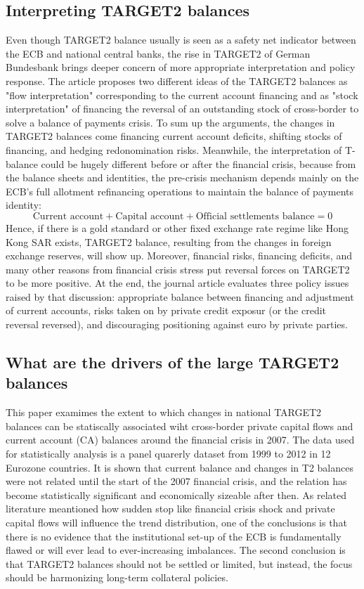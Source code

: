 \documentclass[12pt]{article}
\begin{document}
\subsection{Interpreting TARGET2 balances}
Even though TARGET2 balance usually is seen as a safety net indicator between the ECB and national central banks, the rise in TARGET2 of German Bundesbank brings deeper concern of more appropriate interpretation and policy response. The article proposes two different ideas of the TARGET2 balances as "flow interpretation" corresponding to the current account financing and as "stock interpretation" of financing the reversal of an outstanding stock of cross-border to solve a balance of payments crisis. To sum up the arguments, the changes in TARGET2 balances come financing current account deficits, shifting stocks of financing, and hedging redonomination risks. Meanwhile, the interpretation of T-balance could be hugely different before or after the financial crisis, because from the balance sheets and identities, the pre-crisis mechanism depends mainly on the ECB's full allotment refinancing operations to maintain the balance of payments identity: 
$$
\text{Current account} + \text{Capital account} + \text{Official settlements balance} = 0 
$$
Hence, if there is a gold standard or other fixed exchange rate regime like Hong Kong SAR exists, TARGET2 balance, resulting from the changes in foreign exchange reserves, will show up. Moreover, financial risks, financing deficits, and many other reasons from financial crisis stress put reversal forces on TARGET2 to be more positive. At the end, the journal article evaluates three policy issues raised by that discussion: appropriate balance between financing and adjustment of current accounts, risks taken on by private credit exposur (or the credit reversal reversed), and discouraging positioning against euro by private parties. 

\subsection{What are the drivers of the large TARGET2 balances}
This paper examimes the extent to which changes in national TARGET2 balances can be statiscally associated wiht cross-border private capital flows and current account (CA) balances around the financial crisis in 2007. The data used for statistically analysis is a panel quarerly dataset from 1999 to 2012 in 12 Eurozone countries. It is shown that current balance and changes in T2 balances were not related until the start of the 2007 financial crisis, and the relation has become statistically significant and economically sizeable after then. As related literature meantioned how sudden stop like financial crisis shock and private capital flows will influence the trend distribution, one of the conclusions is that there is no evidence that the institutional set-up of the ECB is fundamentally flawed or will ever lead to ever-increasing imbalances. The second conclusion is that TARGET2 balances should not be settled or limited, but instead, the focus should be harmonizing long-term collateral policies. 
\end{document}
